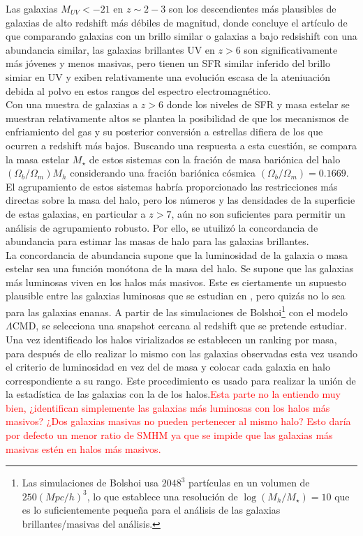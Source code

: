 \documentclass{article}
\begin{document}
Las galaxias $M_{UV}<-21$ en $z\sim 2-3$ son los descendientes más plausibles de galaxias de alto redshift más débiles de magnitud, donde concluye el artículo de \cite{finkelstein2015increasing} que comparando galaxias con un brillo similar o galaxias a bajo redsishift con una abundancia similar, las galaxias brillantes UV en $z>6$ son significativamente más jóvenes y menos masivas, pero tienen un SFR similar inferido del brillo simiar en UV y exiben relativamente una evolución escasa de la ateniuación debida al polvo en estos rangos del espectro electromagnético.\\

Con una muestra de galaxias a $z>6$ donde los niveles de SFR y masa estelar se muestran relativamente altos se plantea la posibilidad de que los mecanismos de enfriamiento del gas y su posterior conversión a estrellas difiera de los que ocurren a redshift más bajos. Buscando una respuesta a esta cuestión, se compara la masa estelar $M_\star$ de estos sistemas con la fración de masa bariónica del halo $(\Omega_b/\Omega_m)M_h$ considerando una fración bariónica cósmica $(\Omega_b/\Omega_m)=0.1669$. El agrupamiento de estos sistemas habría proporcionado las restricciones más directas sobre la masa del halo, pero los números y las densidades de la superficie de estas galaxias, en particular a $z> 7$, aún no son suficientes para permitir un análisis de agrupamiento robusto. Por ello, se utuilizó la concordancia de abundancia para estimar las masas de halo para las galaxias brillantes. \\

La concordancia de abundancia supone que la luminosidad de la galaxia o masa estelar sea una función monótona de la masa del halo. Se supone que las galaxias más luminosas viven en los halos más masivos. Este es ciertamente un supuesto plausible entre las galaxias luminosas que se estudian en \cite{finkelstein2015increasing}, pero quizás no lo sea para las galaxias enanas. A partir de las simulaciones de Bolshoi\footnote{Las simulaciones de Bolshoi usa $2048^3$ partículas en un volumen de $250 (Mpc/h)^3$, lo que establece una resolución de $\log(M_h/M_\star)=10$ que es lo suficientemente pequeña para el análisis de las galaxias brillantes/masivas del análisis.} con el modelo $\Lambda$CMD, se selecciona una snapshot cercana al redshift que se pretende estudiar. Una vez identificado los halos virializados se establecen un ranking por masa, para después de ello realizar lo mismo con las galaxias observadas esta vez usando el criterio de luminosidad en vez del de masa y colocar cada galaxia en halo correspondiente a su rango. Este procedimiento es usado para realizar la unión de la estadística de las galaxias con la de los halos.\textcolor{red}{Esta parte no la entiendo muy bien, ¿identifican simplemente las galaxias más luminosas con los halos más masivos? ¿Dos galaxias masivas no pueden pertenecer al mismo halo? Esto daría por defecto un menor ratio de SMHM ya que se impide que las galaxias más masivas estén en halos más masivos.}\\
\end{document}
